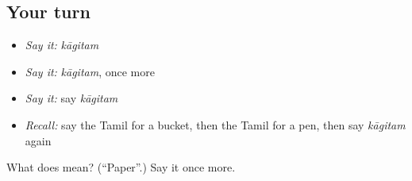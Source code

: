 \subsection*{Your turn}
\begin{itemize}
\raggedright
  \item \emph{Say it:} \emph{kāgitam}
  \item \emph{Say it:} \emph{kāgitam}, once more
  \item \emph{Say it:} say \emph{kāgitam}
  \item \emph{Recall:} say the Tamil for a bucket, then the Tamil for a pen, then say \emph{kāgitam} again
\end{itemize}

\begin{tcolorbox}[breakable,colback=teal!4,colframe=teal!35!black,title={Before you move on}]
What does  mean? (\textquotedblleft{}Paper\textquotedblright{}.) Say it once more.
\end{tcolorbox}
